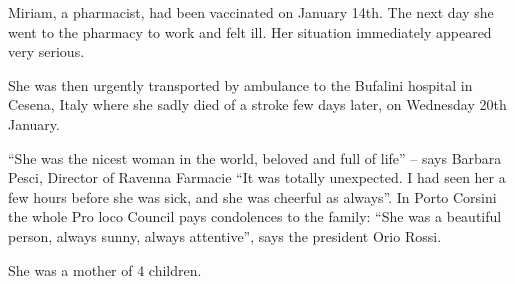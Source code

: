 Miriam, a pharmacist, had been vaccinated on January 14th. The next day she went
to the pharmacy to work and felt ill. Her situation immediately appeared very
serious.

She was then urgently transported by ambulance to the Bufalini hospital in
Cesena, Italy where she sadly died of a stroke few days later, on Wednesday 20th
January.

“She was the nicest woman in the world, beloved and full of life” – says Barbara
Pesci, Director of Ravenna Farmacie “It was totally unexpected. I had seen her a
few hours before she was sick, and she was cheerful as always”. In Porto Corsini
the whole Pro loco Council pays condolences to the family: “She was a beautiful
person, always sunny, always attentive”, says the president Orio Rossi.

She was a mother of 4 children.

